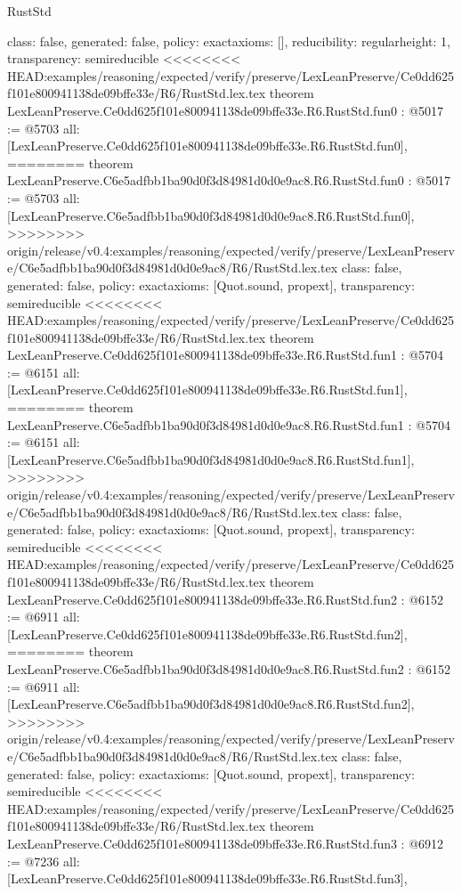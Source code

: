 \begin{lexlean}{RustStd}
\begin{coremodule}
{\begin{coremodule}
{{{  class: false,
  generated: false,
  policy: exact{axioms: []},
  reducibility: regular{height: 1},
  transparency: semireducible
}
<<<<<<<< HEAD:examples/reasoning/expected/verify/preserve/LexLeanPreserve/Ce0dd625f101e800941138de09bffe33e/R6/RustStd.lex.tex
theorem LexLeanPreserve.Ce0dd625f101e800941138de09bffe33e.R6.RustStd.fun0 : @5017 := @5703 {
  all: [LexLeanPreserve.Ce0dd625f101e800941138de09bffe33e.R6.RustStd.fun0],
========
theorem LexLeanPreserve.C6e5adfbb1ba90d0f3d84981d0d0e9ac8.R6.RustStd.fun0 : @5017 := @5703 {
  all: [LexLeanPreserve.C6e5adfbb1ba90d0f3d84981d0d0e9ac8.R6.RustStd.fun0],
>>>>>>>> origin/release/v0.4:examples/reasoning/expected/verify/preserve/LexLeanPreserve/C6e5adfbb1ba90d0f3d84981d0d0e9ac8/R6/RustStd.lex.tex
  class: false,
  generated: false,
  policy: exact{axioms: [Quot.sound, propext]},
  transparency: semireducible
}
<<<<<<<< HEAD:examples/reasoning/expected/verify/preserve/LexLeanPreserve/Ce0dd625f101e800941138de09bffe33e/R6/RustStd.lex.tex
theorem LexLeanPreserve.Ce0dd625f101e800941138de09bffe33e.R6.RustStd.fun1 : @5704 := @6151 {
  all: [LexLeanPreserve.Ce0dd625f101e800941138de09bffe33e.R6.RustStd.fun1],
========
theorem LexLeanPreserve.C6e5adfbb1ba90d0f3d84981d0d0e9ac8.R6.RustStd.fun1 : @5704 := @6151 {
  all: [LexLeanPreserve.C6e5adfbb1ba90d0f3d84981d0d0e9ac8.R6.RustStd.fun1],
>>>>>>>> origin/release/v0.4:examples/reasoning/expected/verify/preserve/LexLeanPreserve/C6e5adfbb1ba90d0f3d84981d0d0e9ac8/R6/RustStd.lex.tex
  class: false,
  generated: false,
  policy: exact{axioms: [Quot.sound, propext]},
  transparency: semireducible
}
<<<<<<<< HEAD:examples/reasoning/expected/verify/preserve/LexLeanPreserve/Ce0dd625f101e800941138de09bffe33e/R6/RustStd.lex.tex
theorem LexLeanPreserve.Ce0dd625f101e800941138de09bffe33e.R6.RustStd.fun2 : @6152 := @6911 {
  all: [LexLeanPreserve.Ce0dd625f101e800941138de09bffe33e.R6.RustStd.fun2],
========
theorem LexLeanPreserve.C6e5adfbb1ba90d0f3d84981d0d0e9ac8.R6.RustStd.fun2 : @6152 := @6911 {
  all: [LexLeanPreserve.C6e5adfbb1ba90d0f3d84981d0d0e9ac8.R6.RustStd.fun2],
>>>>>>>> origin/release/v0.4:examples/reasoning/expected/verify/preserve/LexLeanPreserve/C6e5adfbb1ba90d0f3d84981d0d0e9ac8/R6/RustStd.lex.tex
  class: false,
  generated: false,
  policy: exact{axioms: [Quot.sound, propext]},
  transparency: semireducible
}
<<<<<<<< HEAD:examples/reasoning/expected/verify/preserve/LexLeanPreserve/Ce0dd625f101e800941138de09bffe33e/R6/RustStd.lex.tex
theorem LexLeanPreserve.Ce0dd625f101e800941138de09bffe33e.R6.RustStd.fun3 : @6912 := @7236 {
  all: [LexLeanPreserve.Ce0dd625f101e800941138de09bffe33e.R6.RustStd.fun3],
}}}}}}
\end{coremodule}}
\end{coremodule}
\end{lexlean}
